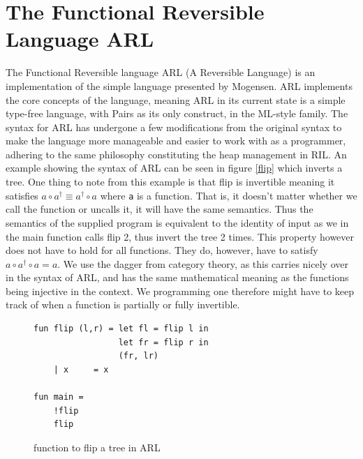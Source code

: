 \documentclass[a4paper]{article}
\begin{document}
\section{The Functional Reversible Language ARL}
\label{sec:org31f5b6b}
The Functional Reversible language ARL (A Reversible Language) is an
implementation of the simple language presented by Mogensen\cite{Mogensen2018ReversibleGC}. ARL implements the core concepts of the language, meaning ARL in its current state is a simple type-free language, with Pairs as its only construct, in the ML-style family. The syntax for ARL has undergone a few modifications from the original syntax to make
the language more manageable and easier to work with as a programmer, adhering to
the same philosophy constituting the heap management in RIL. An example showing the syntax of ARL can be seen in figure \ref{flip} which inverts a tree. One thing to note from this example is
that flip is invertible meaning it satisfies \(a \circ a^{\dag} \equiv a^{\dag} \circ a\) where \texttt{a} is a function.
That is, it doesn't matter whether we call the function or uncalls it, it will have the same semantics. Thus the semantics of the supplied program is equivalent to the identity of input as we in the main function calls flip 2, thus invert the tree 2 times. This property however does not have to hold for all functions. They do, however, have to satisfy \(a \circ a^{\dag} \circ a = a\). We use the dagger from category theory, as this carries nicely over in the syntax of ARL, and has the same mathematical meaning as the functions being injective in the context. We programming one therefore might have to keep track of when a function is partially or fully invertible.


\begin{figure}[!htb]
\begin{lstlisting}
fun flip (l,r) = let fl = flip l in
                 let fr = flip r in
                 (fr, lr)
    | x     = x

fun main =
    !flip
    flip
\end{lstlisting}
\caption{function to flip a tree in ARL}
\label{tree}
\end{figure}
\end{document}

